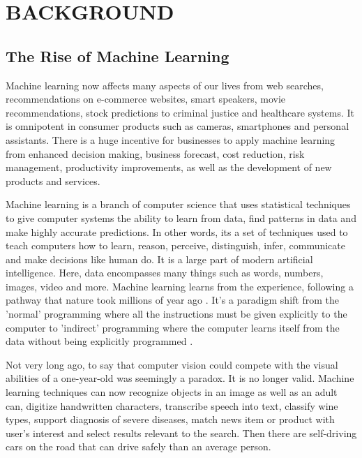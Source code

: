 
\chapter{BACKGROUND}

\graphicspath{ {./background/} }
\thispagestyle{empty}


\section{The Rise of Machine Learning}

Machine learning now affects many aspects of our lives from web searches,  recommendations on e-commerce websites, smart speakers, movie recommendations, stock predictions to criminal justice and healthcare systems. It is omnipotent in consumer products such as cameras, smartphones and personal assistants. There is a huge incentive for businesses to apply machine learning from enhanced decision making, business forecast, cost reduction, risk management, productivity improvements, as well as the development of new products and services.

Machine learning is a branch of computer science that uses statistical techniques to give computer systems the ability to learn from data, find patterns in data and make highly accurate predictions. In other words, its a set of techniques used to teach computers how to learn, reason, perceive, distinguish, infer, communicate and make decisions like human do. It is a large part of modern artificial intelligence. Here, data encompasses many things such as words, numbers, images, video and more. Machine learning learns from the experience, following a pathway that nature took millions of year ago \cite{sammut2011encyclopedia}. It's a paradigm shift from the 'normal' programming where all the instructions must be given explicitly to the computer to 'indirect' programming where the computer learns itself from the data without being explicitly programmed .

Not very long ago, to say that computer vision could compete with the visual abilities of a one-year-old was seemingly a paradox\cite{sejnowski2018deep}. It is no longer valid. Machine learning techniques can now recognize objects in an image as well as an adult can, digitize handwritten characters, transcribe speech into text, classify wine types, support diagnosis of severe diseases, match news item or product with user's interest and select results relevant to the search. Then there are self-driving cars \cite{sejnowski2018deep} on the road that can drive safely than an average person. 

